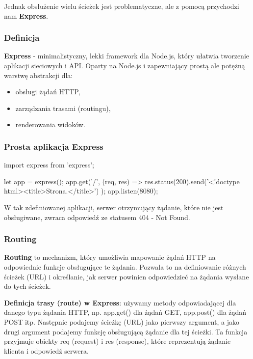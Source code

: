 Jednak obsłużenie wielu ścieżek jest problematyczne, ale z pomocą przychodzi nam \textbf{Express}.

\subsubsection{Definicja}
\textbf{Express} - minimalistyczny, lekki framework dla Node.js, który ułatwia tworzenie aplikacji sieciowych i API. Oparty na Node.js i zapewniający prostą ale potężną warstwę abstrakcji dla:
    \begin{itemize}
        \item obsługi żądań HTTP,
        \item zarządzania trasami (routingu),
        \item renderowania widoków.
    \end{itemize}

\subsubsection{Prosta aplikacja Express}

\begin{js}
import express from 'express';

let app = express();
app.get('/', (req, res) => {
  res.status(200).send('<!doctype html><title>Strona.</title>')
});
app.listen(8080);
\end{js}

W tak zdefiniowanej aplikacji, serwer otrzymujący żądanie, które nie jest obsługiwane, zwraca odpowiedź ze statusem 404 - Not Found.

\subsubsection{Routing}
\textbf{Routing} to mechanizm, który umożliwia mapowanie żądań HTTP na odpowiednie funkcje obsługujące te żądania. Pozwala to na definiowanie różnych ścieżek (URL) i określanie, jak serwer powinien odpowiedzieć na żądania wysłane do tych ścieżek.

\textbf{Definicja trasy (route) w Express}: używamy metody odpowiadającej dla danego typu żądania HTTP, np. app.get() dla żądań GET, app.post() dla żądań POST itp. Następnie podajemy ścieżkę (URL) jako pierwszy argument, a jako drugi argument podajemy funkcję obsługującą żądanie dla tej ścieżki. Ta funkcja przyjmuje obiekty req (request) i res (response), które reprezentują żądanie klienta i odpowiedź serwera.

